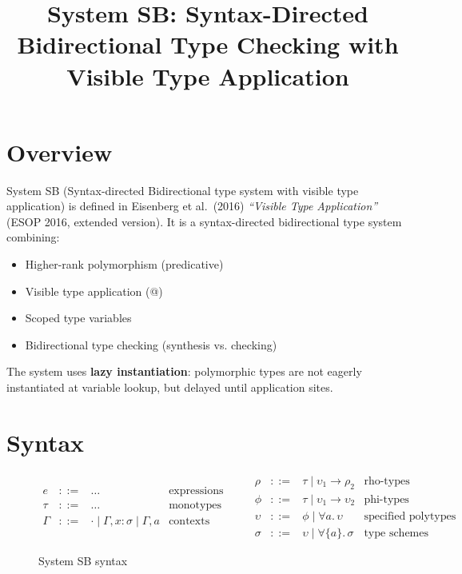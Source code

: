 \documentclass[11pt,a4paper]{article}
\begin{document}
\title{System SB: Syntax-Directed Bidirectional Type Checking with Visible Type Application}
\date{}
\maketitle

\section{Overview}

System SB (Syntax-directed Bidirectional type system with visible type application) is defined in Eisenberg et al.\ (2016) \textit{``Visible Type Application''} (ESOP 2016, extended version). It is a syntax-directed bidirectional type system combining:
\begin{itemize}
\item Higher-rank polymorphism (predicative)
\item Visible type application (@)
\item Scoped type variables
\item Bidirectional type checking (synthesis vs. checking)
\end{itemize}

The system uses \textbf{lazy instantiation}: polymorphic types are not eagerly instantiated at variable lookup, but delayed until application sites.

\section{Syntax}

\begin{figure}[h]
\centering
\[
\begin{array}{rcll}
e & ::= & \ldots & \text{expressions} \\
\tau & ::= & \ldots & \text{monotypes} \\
\Gamma & ::= & \cdot \mid \Gamma, x\!:\!\sigma \mid \Gamma, a & \text{contexts}
\end{array}
\qquad
\begin{array}{rcll}
\rho & ::= & \tau \mid \upsilon_1 \to \rho_2 & \text{rho-types} \\
\phi & ::= & \tau \mid \upsilon_1 \to \upsilon_2 & \text{phi-types} \\
\upsilon & ::= & \phi \mid \forall a.\, \upsilon & \text{specified polytypes} \\
\sigma & ::= & \upsilon \mid \forall\{a\}.\, \sigma & \text{type schemes}
\end{array}
\]
\caption{System SB syntax}
\end{figure}
\end{document}
